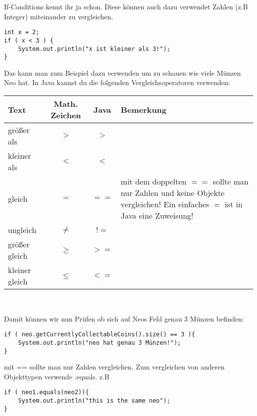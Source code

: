 \begin{Infobox}[If-Conditions 2]
If-Conditions kennt ihr ja schon. Diese können auch dazu verwendet Zahlen (z.B Integer) miteinander zu vergleichen.
\begin{lstlisting}
int x = 2;
if ( x < 3 ) {
	System.out.println("x ist kleiner als 3!");
}
\end{lstlisting}
Das kann man zum Beispiel dazu verwenden um zu schauen wie viele Münzen Neo hat. In Java kannst du die folgenden Vergleichsoperatoren verwenden:
\begin{center}
        \begin{tabular}{ l | c | c | l }
                Text & Math. Zeichen & Java & Bemerkung\\
            \hline
                  gr\"oßer als & $>$ & $>$ & \\
                  kleiner als & $<$ & $<$ & \\
                  gleich & $=$ & $==$ & \minibox{mit dem doppelten $==$ sollte man nur \\ Zahlen und keine Objekte vergleichen!\\ Ein einfaches $=$ ist in Java eine Zuweisung!}\\

                  ungleich & $\neq$ & $!=$ & \\
                  gr\"oßer gleich & $\geq$ & $>=$ &  \\

                  kleiner gleich & $\leq$ & $<=$ &  \\
        \end{tabular} \\
\end{center}

Damit können wir nun Prüfen ob sich auf Neos Feld genau 3 Münzen befinden:
\begin{lstlisting}
if ( neo.getCurrentlyCollectableCoins().size() == 3 ){
	System.out.println("neo hat genau 3 Münzen!");
}
\end{lstlisting}
\end{Infobox}
\begin{Infobox}[\lstinline{==} und \lstinline{.equals()}]
mit == sollte man nur Zahlen vergleichen. Zum vergleichen von anderen Objekttypen verwende .equals. z.B 
\begin{lstlisting}
if ( neo1.equals(neo2)){
	System.out.println("this is the same neo");
}
\end{lstlisting}

\end{Infobox}


